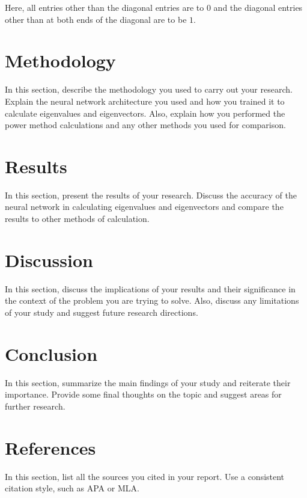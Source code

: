 \documentclass{article}
\begin{document}
Here, all entries other than the diagonal entries are to $0$ and the diagonal entries other than at both ends of the diagonal are to be $1$.

\section{Methodology}
In this section, describe the methodology you used to carry out your research. Explain the neural network architecture you used and how you trained it to calculate eigenvalues and eigenvectors. Also, explain how you performed the power method calculations and any other methods you used for comparison.

\section{Results}
In this section, present the results of your research. Discuss the accuracy of the neural network in calculating eigenvalues and eigenvectors and compare the results to other methods of calculation.

\section{Discussion}
In this section, discuss the implications of your results and their significance in the context of the problem you are trying to solve. Also, discuss any limitations of your study and suggest future research directions.

\section{Conclusion}
In this section, summarize the main findings of your study and reiterate their importance. Provide some final thoughts on the topic and suggest areas for further research.

\section{References}
In this section, list all the sources you cited in your report. Use a consistent citation style, such as APA or MLA.
\end{document}
